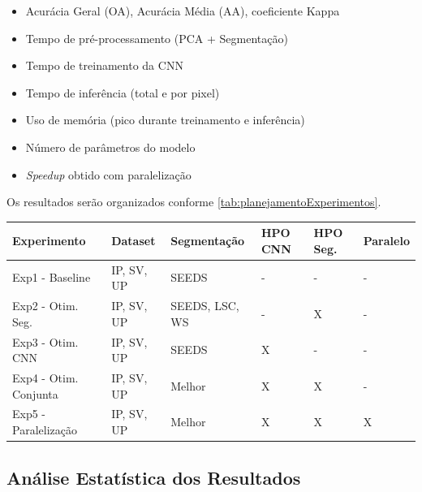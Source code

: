 \begin{itemize}
    \item Acurácia Geral (OA), Acurácia Média (AA), coeficiente Kappa
    \item Tempo de pré-processamento (PCA + Segmentação)
    \item Tempo de treinamento da CNN
    \item Tempo de inferência (total e por pixel)
    \item Uso de memória (pico durante treinamento e inferência)
    \item Número de parâmetros do modelo
    \item \textit{Speedup} obtido com paralelização
\end{itemize}

Os resultados serão organizados conforme \autoref{tab:planejamentoExperimentos}.

\begin{quadro}[H]
    \centering
    \caption{Planejamento de experimentos}
    \begin{tabular}{|p{}|p{}|p{}|p{}|p{}|p{}|}
        \hline
        \rowcolor[HTML]{C0C0C0}
        \textbf{Experimento} & \textbf{Dataset} & \textbf{Segmentação} & \textbf{HPO CNN} & \textbf{HPO Seg.} & \textbf{Paralelo} \\
        \hline
        
        Exp1 - Baseline & IP, SV, UP & SEEDS & - & - & - \\
        \hline
        
        Exp2 - Otim. Seg. & IP, SV, UP & SEEDS, LSC, WS & - & X & - \\
        \hline
        
        Exp3 - Otim. CNN & IP, SV, UP & SEEDS & X & - & - \\
        \hline
        
        Exp4 - Otim. Conjunta & IP, SV, UP & Melhor & X & X & - \\
        \hline
        
        Exp5 - Paralelização & IP, SV, UP & Melhor & X & X & X \\
        \hline
    \end{tabular}
    \label{tab:planejamentoExperimentos}
\end{quadro}

\subsection{Análise Estatística dos Resultados}

